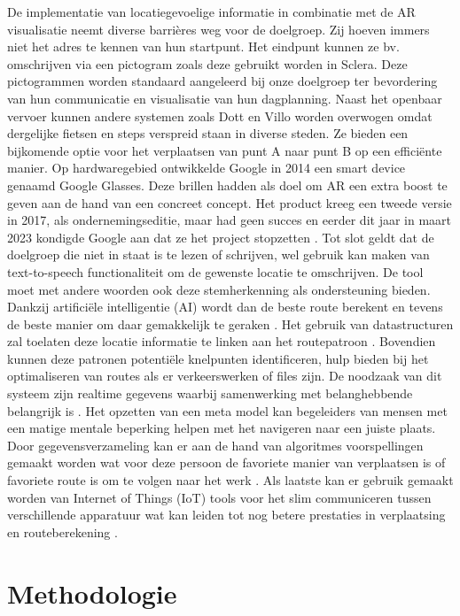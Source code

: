 \documentclass{hogent-article}
\begin{document}
    De implementatie van locatiegevoelige informatie in combinatie met de AR visualisatie neemt diverse barrières weg voor de doelgroep. Zij hoeven immers niet het adres te kennen van hun startpunt. Het eindpunt kunnen ze bv. omschrijven via een pictogram zoals deze gebruikt worden in Sclera. Deze pictogrammen worden standaard aangeleerd bij onze doelgroep ter bevordering van hun communicatie en visualisatie van hun dagplanning.
    Naast het openbaar vervoer kunnen andere systemen zoals Dott en Villo worden overwogen omdat dergelijke fietsen en steps verspreid staan in diverse steden. Ze bieden een bijkomende optie voor het verplaatsen van punt A naar punt B op een efficiënte manier.
    Op hardwaregebied ontwikkelde Google in 2014 een smart device genaamd Google Glasses. Deze brillen hadden als doel om AR een extra boost te geven aan de hand van een concreet concept. Het product kreeg een tweede versie in 2017, als ondernemingseditie, maar had geen succes en eerder dit jaar in maart 2023 kondigde Google aan dat ze het project stopzetten \autocite{Gvora2023}.
    Tot slot geldt dat de doelgroep die niet in staat is te lezen of schrijven, wel gebruik kan maken van text-to-speech functionaliteit om de gewenste locatie te omschrijven. De tool moet met andere woorden ook deze stemherkenning als ondersteuning bieden. Dankzij artificiële intelligentie (AI) wordt dan de beste route berekent en tevens de beste manier om daar gemakkelijk te geraken \autocite{Soni2023a}. 
    Het gebruik van datastructuren zal toelaten deze locatie informatie te linken aan het routepatroon \autocite{Ruta2010}. Bovendien kunnen deze patronen potentiële knelpunten identificeren, hulp bieden bij het optimaliseren van routes als er verkeerswerken of files zijn. De noodzaak van dit systeem zijn realtime gegevens waarbij samenwerking met belanghebbende belangrijk is \autocite{Ciravegna2018}. 
    Het opzetten van een meta model kan begeleiders van mensen met een matige mentale beperking helpen met het navigeren naar een juiste plaats. Door gegevensverzameling kan er aan de hand van algoritmes voorspellingen gemaakt worden wat voor deze persoon de favoriete manier van verplaatsen is of favoriete route is om te volgen naar het werk \autocite{Stepanov2003}. Als laatste kan er gebruik gemaakt worden van Internet of Things (IoT) tools voor het slim communiceren tussen verschillende apparatuur wat kan leiden tot nog betere prestaties in verplaatsing en routeberekening \autocite{Fatnassi2015}.
    \section{Methodologie}%
   
\end{document}
